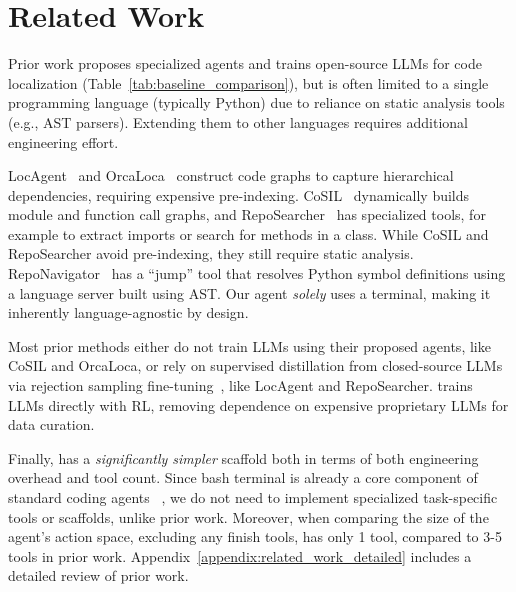 
\section{Related Work}
\label{sec:background}
Prior work proposes specialized agents and trains open-source LLMs for code localization (Table~\ref{tab:baseline_comparison}), but is often limited to a single programming language (typically Python) due to reliance on static analysis tools (e.g., AST parsers). Extending them to other languages requires additional engineering effort. 

LocAgent~\citep{chen-etal-2025-locagent} and OrcaLoca~\citep{ yu2025orcalocallmagentframework} construct code graphs to capture hierarchical dependencies, requiring expensive pre-indexing. CoSIL~\citep{jiang2025issuelocalizationllmdriveniterative} dynamically builds module and function call graphs, and RepoSearcher~\citep{ma2025toolintegratedreinforcementlearningrepo} has specialized tools, for example to extract imports or search for methods in a class. While CoSIL and RepoSearcher avoid pre-indexing, they still require static analysis. RepoNavigator~\citep{zhang2025one} has a ``jump'' tool that resolves Python symbol definitions using a language server built using AST. Our agent \emph{solely} uses a terminal, making it inherently language-agnostic by design.

% 
Most prior methods either do not train LLMs using their proposed agents, like CoSIL and OrcaLoca, or rely on supervised distillation from closed-source LLMs via rejection sampling fine-tuning~\citep{yuan2023scalingrelationshiplearningmathematical}, like LocAgent and RepoSearcher. \methodname trains LLMs directly with RL, removing dependence on expensive proprietary LLMs for data curation.

Finally, \methodname has a \emph{significantly simpler} scaffold both in terms of both engineering overhead and tool count. Since bash terminal is already a core component of standard coding agents ~\citep{wang2025openhandssoftwareagentsdk, yang2024sweagentagentcomputerinterfacesenable, anthropic_claude_code_2025}, we do not need to implement specialized task-specific tools or scaffolds, unlike prior work. Moreover, when comparing the size of the agent's action space, excluding any finish tools, \methodname has only 1 tool, compared to 3-5 tools in prior work. Appendix~\ref{appendix:related_work_detailed} includes a detailed review of prior work.

